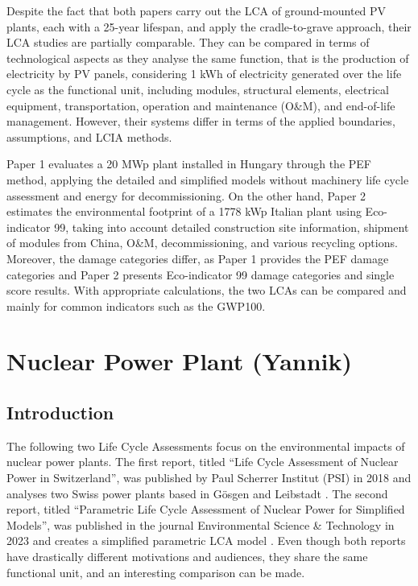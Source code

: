 \documentclass[9pt]{extarticle}
\begin{document}
Despite the fact that both papers carry out the LCA of ground-mounted PV plants, each
with a 25-year lifespan, and apply the cradle-to-grave approach, their LCA studies are
partially comparable. They can be compared in terms of technological aspects as they
analyse the same function, that is the production of electricity by PV panels,
considering 1 kWh of electricity generated over the life cycle as the
functional unit, including modules, structural elements, electrical equipment,
transportation, operation and maintenance (O\&M), and end-of-life management. However,
their systems differ in terms of the applied boundaries, assumptions, and LCIA methods.

Paper 1 evaluates a 20 MWp plant installed in Hungary through the PEF method,
applying the detailed and simplified models without machinery life cycle assessment
and energy for decommissioning. On the other hand, Paper 2 estimates the environmental
footprint of a 1778 kWp Italian plant using Eco-indicator 99, taking into account
detailed construction site information, shipment of modules from China, O\&M,
decommissioning, and various recycling options. Moreover, the damage categories differ,
as Paper 1 provides the PEF damage categories and Paper 2 presents Eco-indicator 99
damage categories and single score results. With appropriate calculations, the two LCAs
can be compared and mainly for common indicators such as the GWP100.

\newpage
\section{Nuclear Power Plant {\small (Yannik)}}

\subsection{Introduction}
The following two Life Cycle Assessments focus on the environmental impacts of nuclear
power plants. The first report, titled ``Life Cycle Assessment of Nuclear Power in Switzerland'',
was published by Paul Scherrer Institut (PSI) in 2018 and analyses two
Swiss power plants based in Gösgen and Leibstadt \parencite{zhang}. The second report, titled
``Parametric Life Cycle Assessment of Nuclear Power for Simplified Models'', was published
in the journal Environmental Science \& Technology in 2023 and creates a simplified
parametric LCA model \parencite{yannik2}. Even though both reports have drastically
different motivations and audiences, they share the same functional unit, and an
interesting comparison can be made.
\end{document}
